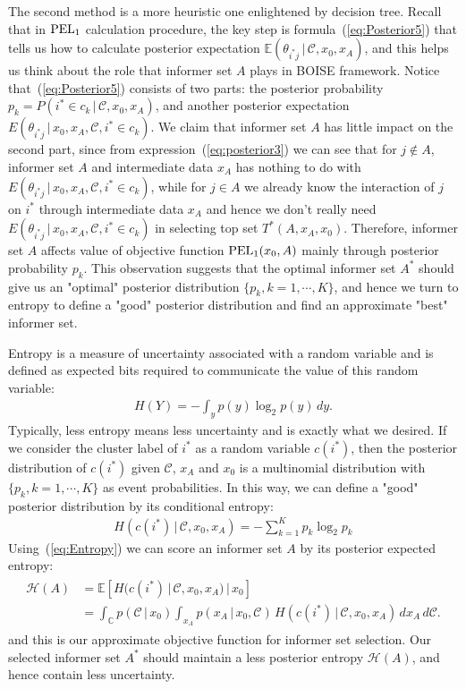 \documentclass[12pt]{article}
\begin{document}
The second method is a more heuristic one enlightened by decision tree. Recall that in ${\rm PEL}_1$ calculation procedure, the key step is formula~(\ref{eq:Posterior5}) that tells us how to calculate posterior expectation $\mathbb E(\theta_{i^*j}\,|\, \mathcal C, x_0,x_A)$, and this helps us think about the role that informer set $A$ plays in BOISE framework. Notice that~(\ref{eq:Posterior5}) consists of two parts: the posterior probability $p_k = P(i^*\in c_k\,|\,\mathcal{C},x_0,x_A)$, and another posterior expectation $E(\theta_{i^*j}\,|\, x_0,x_A,\mathcal{C},i^*\in c_k)$. We claim that informer set $A$ has little impact on the second part, since from expression~(\ref{eq:posterior3}) we can see that for $j\notin A$, informer set $A$ and intermediate data $x_A$ has nothing to do with $E(\theta_{i^*j}\,|\, x_0,x_A,\mathcal{C},i^*\in c_k)$, while for $j\in A$ we already know the interaction of $j$ on $i^*$ through intermediate data $x_A$ and hence we don't really need $E(\theta_{i^*j}\,|\, x_0,x_A,\mathcal{C},i^*\in c_k)$ in selecting top set $T^*(A,x_A,x_0)$. Therefore, informer set $A$ affects value of objective function ${\rm PEL}_1(x_0,A)$ mainly through posterior probability $p_k$. This observation suggests that the optimal informer set $A^*$ should give us an "optimal" posterior distribution $\{p_k,k=1,\cdots,K\}$, and hence we turn to entropy to define a "good" posterior distribution and find an approximate "best" informer set.  

Entropy is a measure of uncertainty associated with a random variable and is defined as expected bits required to communicate the value of this random variable:
\begin{eqnarray*}
H(Y) = -\int_y p(y)\log_2p(y)\,dy.
\end{eqnarray*}
Typically, less entropy means less uncertainty and is exactly what we desired. If we consider the cluster label of $i^*$ as a random variable $c(i^*)$, then the posterior distribution of $c(i^*)$ given $\mathcal C$, $x_A$ and $x_0$ is a multinomial distribution with $\{p_k,k=1,\cdots,K\}$ as event probabilities. In this way, we can define a "good" posterior distribution by its conditional entropy:
\begin{eqnarray}
\label{eq:Entropy}
H\left(c(i^*)\,|\,\mathcal{C},x_0,x_A\right) = -\sum_{k=1}^K p_k\log_2p_k
\end{eqnarray}
Using~(\ref{eq:Entropy}) we can score an informer set $A$ by its posterior expected entropy:
\begin{align}
    \label{eq:Score}
    \begin{split}
        \mathcal H(A) &= \mathbb E\left[H(c(i^*)\,|\,\mathcal{C},x_0,x_A)\,|\, x_0\right]\\
        &= \int_\mathbb{C} p(\mathcal{C}\,|\,x_0)\int_{x_A} p(x_A\,|\,x_0,\mathcal{C}) \, H\left(c(i^*)\,|\,\mathcal{C},x_0,x_A\right)\,dx_A\,d\mathcal{C}.
    \end{split}
\end{align}
and this is our approximate objective function for informer set selection. Our selected informer set $A^*$ should maintain a less posterior entropy $\mathcal H(A)$, and hence contain less uncertainty. 
\end{document}
